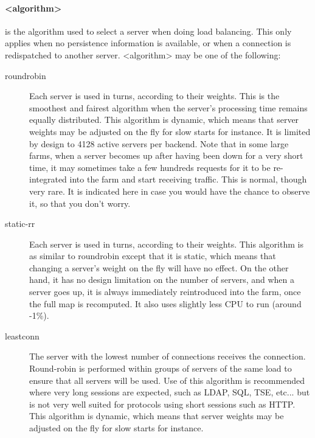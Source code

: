     \paragraph*{<algorithm>}
                is the algorithm used to select a server when doing load
                balancing. This only applies when no persistence information
                is available, or when a connection is redispatched to another
                server. <algorithm> may be one of the following:
      \begin{description}
      \item[roundrobin]  Each server is used in turns, according to their weights.
                  This is the smoothest and fairest algorithm when the server's
                  processing time remains equally distributed. This algorithm
                  is dynamic, which means that server weights may be adjusted
                  on the fly for slow starts for instance. It is limited by
                  design to 4128 active servers per backend. Note that in some
                  large farms, when a server becomes up after having been down
                  for a very short time, it may sometimes take a few hundreds
                  requests for it to be re-integrated into the farm and start
                  receiving traffic. This is normal, though very rare. It is
                  indicated here in case you would have the chance to observe
                  it, so that you don't worry.

      \item[static-rr]   Each server is used in turns, according to their weights.
                  This algorithm is as similar to roundrobin except that it is
                  static, which means that changing a server's weight on the
                  fly will have no effect. On the other hand, it has no design
                  limitation on the number of servers, and when a server goes
                  up, it is always immediately reintroduced into the farm, once
                  the full map is recomputed. It also uses slightly less CPU to
                  run (around -1\%).

      \item[leastconn]   The server with the lowest number of connections receives the
                  connection. Round-robin is performed within groups of servers
                  of the same load to ensure that all servers will be used. Use
                  of this algorithm is recommended where very long sessions are
                  expected, such as LDAP, SQL, TSE, etc... but is not very well
                  suited for protocols using short sessions such as HTTP. This
                  algorithm is dynamic, which means that server weights may be
                  adjusted on the fly for slow starts for instance.


\end{description}
